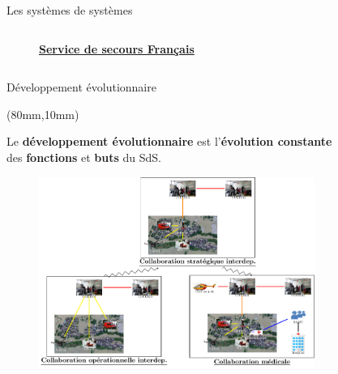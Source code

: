 \begin{frame}{Les systèmes de systèmes}
\begin{columns}
\begin{column}{0.5\textwidth}
\begin{figure}
\caption{\underline{\textbf{Service de secours Français}}}
\end{figure}
\end{column}
\end{columns}
\end{frame}

\begin{frame}{Développement évolutionnaire}

\begin{textblock*}{4.5cm}(80mm,10mm)
\begin{block}{}
Le \textbf{développement évolutionnaire} est l'\textbf{évolution
constante} \\
des \textbf{fonctions} et \textbf{buts} du SdS.
\end{block}
\end{textblock*}

\begin{figure}
\flushleft
\includegraphics[width=9cm]{imgs/dev_evolutionnaire.pdf}
\end{figure}
\end{frame}


